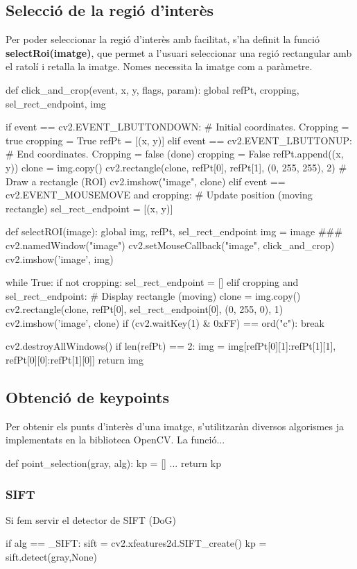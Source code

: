 	\subsection{Selecció de la regió d'interès}
		Per poder seleccionar la regió d'interès amb facilitat, s'ha definit la funció \textbf{selectRoi(imatge)}, que permet a l'usuari seleccionar una regió rectangular amb el ratolí i retalla la imatge.
		Nomes necessita la imatge com a paràmetre.\\
		\begin{python}
def click_and_crop(event, x, y, flags, param):
	global refPt, cropping, sel_rect_endpoint, img
 
	if event == cv2.EVENT_LBUTTONDOWN:	# Initial coordinates. Cropping = true
		cropping = True
		refPt = [(x, y)] 
	elif event == cv2.EVENT_LBUTTONUP:	# End coordinates. Cropping = false (done)
		cropping = False
		refPt.append((x, y)) 
		clone = img.copy()
		cv2.rectangle(clone, refPt[0], refPt[1], (0, 255, 255), 2)	# Draw a rectangle (ROI)
		cv2.imshow("image", clone)
	elif event == cv2.EVENT_MOUSEMOVE and cropping:	# Update position (moving rectangle)
		sel_rect_endpoint = [(x, y)]

def selectROI(image):
	global img, refPt, sel_rect_endpoint
	img = image ###
	cv2.namedWindow("image")
	cv2.setMouseCallback("image", click_and_crop)
	cv2.imshow('image', img)

	while True:
		if not cropping:
			sel_rect_endpoint = []
		elif cropping and sel_rect_endpoint:	# Display rectangle (moving)
			clone = img.copy()
			cv2.rectangle(clone, refPt[0], sel_rect_endpoint[0], (0, 255, 0), 1)
			cv2.imshow('image', clone)
		if (cv2.waitKey(1) & 0xFF) == ord("c"):
			break

	cv2.destroyAllWindows()
	if len(refPt) == 2:
		img = img[refPt[0][1]:refPt[1][1], refPt[0][0]:refPt[1][0]]
	return img
		\end{python}
	\subsection{Obtenció de keypoints}
		Per obtenir els punts d'interès d'una imatge, s'utilitzaràn diversos algorismes ja implementats en la biblioteca OpenCV. La funció... \\
		\begin{python}
def point_selection(gray, alg):
	kp = []
	...
	return kp
		\end{python}

		\subsubsection{SIFT}
		Si fem servir el detector de SIFT (DoG)
		\begin{python}
	if alg == _SIFT:
		sift = cv2.xfeatures2d.SIFT_create()
		kp = sift.detect(gray,None)
		\end{python}

